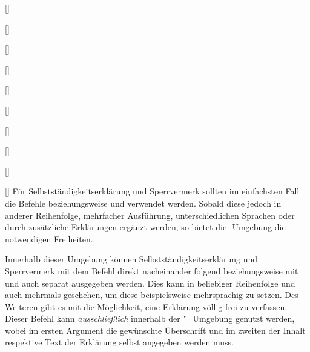 \begin{Declaration}[v2.02]{[]}
\begin{Declaration}[v2.04]{%
}
\begin{Declaration}{[]}
\begin{Declaration}[v2.02]{%
  []%
}
\begin{Declaration}[v2.02]{%
  []%
}
\begin{Declaration}[v2.02]{%
  []%
}
\begin{Declaration}{[\PSet]}
\begin{Declaration}{%
  []
}
\begin{Declaration}{[]}
\begin{Declaration}{[]}
\begin{Declaration}{[]}
\printdeclarationlist%
%
%
Für Selbstständigkeitserklärung und Sperrvermerk sollten im einfachsten Fall 
die Befehle  beziehungsweise  und 
 verwendet werden. Sobald diese jedoch in anderer Reihenfolge,  
mehrfacher Ausführung, unterschiedlichen Sprachen oder durch zusätzliche  
Erklärungen ergänzt werden, so bietet die -Umgebung 
die notwendigen Freiheiten.

Innerhalb dieser Umgebung können Selbstständigkeitserklärung und Sperrvermerk 
mit dem Befehl  direkt nacheinander folgend beziehungsweise 
mit  und  auch separat ausgegeben werden. 
Dies kann in beliebiger Reihenfolge und auch mehrmals geschehen, um diese 
beispielsweise mehrsprachig zu setzen.
 Des Weiteren gibt es mit  die 
Möglichkeit, eine Erklärung völlig frei zu verfassen. Dieser Befehl kann 
\emph{ausschließlich} innerhalb der "=Umgebung 
genutzt werden, wobei im ersten Argument die gewünschte Überschrift und im 
zweiten der Inhalt respektive Text der Erklärung selbst angegeben werden muss.


\end{Declaration}
\end{Declaration}
\end{Declaration}
\end{Declaration}
\end{Declaration}
\end{Declaration}
\end{Declaration}
\end{Declaration}
\end{Declaration}
\end{Declaration}
\end{Declaration}

